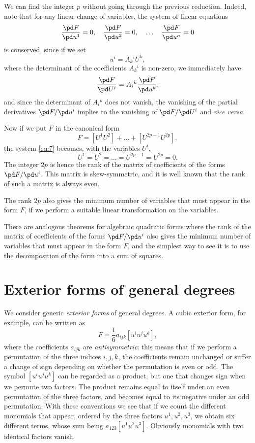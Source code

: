 We can find the integer $p$ without going through the previous reduction. Indeed, note that for any linear change of  variables, the system of linear equations
\begin{equation}
  \label{eq:7}
  \frac{\pd F}{\pd u^{1}}=0,\quad \frac{\pd F}{\pd u^{2}}=0,\quad \dots\quad\frac{\pd F}{\pd u^{n}}=0
\end{equation}
is conserved, since if we set
\[
u^{i}=A_{k}{}^{i}U^{k},
\]
where the determinant of the coefficients $A_{k}{}^{i}$ is non-zero, we immediately  have
\[
\frac{\pd F}{\pd U^{i}}=A_{i}{}^{k}\frac{\pd F}{\pd u^{k}},
\]
and since the determinant of $A_{i}{}^{k}$ does not vanish, the vanishing of the partial derivatives $\pd F/\pd u^{i}$ implies to the vanishing of $\pd F/\pd U^{i}$ and \emph{vice versa}.

Now if we put $F$ in the canonical form
\[
F=[U^{1}U^{2}]+\dots+[U^{2p-1}U^{2p}],
\]
the system \eqref{eq:7} becomes, with the variables $U^{i}$,
\[
U^{1}=U^{2}=\dots=U^{2p-1}=U^{2p}=0.
\]
The integer $2p$ is hence the rank of the matrix of coefficients of the forms $\pd F/\pd u^{i}$. This matrix is skew-symmetric, and it is well known that the rank of such a matrix is always even.

The rank $2p$ also gives the minimum number of variables that must appear in the form $F$, if we perform a suitable linear transformation on the variables.

There are analogous theorems for algebraic quadratic forms where the rank of the matrix of coefficients of the forms $\pd F/\pd u^{i}$ also gives the minimum number of variables that must appear in the form $F$, and the simplest way to see it is to use the decomposition of the form into a sum of squares.

\section{Exterior forms of general degrees}
\label{sec:exter-forms-unsp}
\fsec We consider generic \emph{exterior forms} of general degrees. A cubic exterior form, for example, can be written as
\begin{equation}
  \label{eq:8}
  F=\frac{1}{6}a_{ijk}[u^{i}u^{j}u^{k}],
\end{equation}
where the coefficients $a_{ijk}$ are \emph{antisymmetric}: this means that if we perform a permutation of the three indices $i,j,k$, the coefficients remain unchanged or suffer a change of sign depending on whether the permutation is even or odd. The symbol $[u^{i}u^{j}u^{k}]$ can be regarded as a product, but one that changes sign when we permute two factors. The product remains equal to itself under an even permutation of the three factors, and becomes equal to its negative under an odd permutation. With these conventions we see that if we count the different monomials that appear, ordered by the three factors $u^{1},u^{2},u^{3}$, we obtain six different terms, whose sum being $a_{123}[u^{1}u^{2}u^{3}]$. Obviously monomials with two identical factors vanish.

